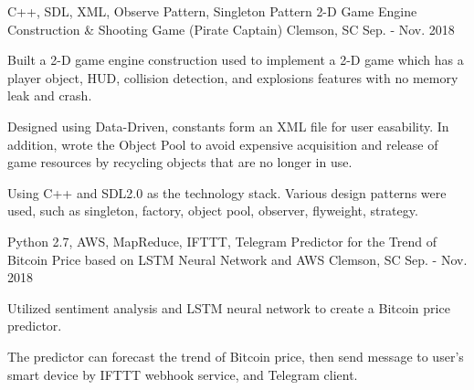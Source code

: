 

\begin{cventries}



  \cventry
    {C++, SDL, XML, Observe Pattern, Singleton Pattern} %
    {2-D Game Engine Construction \& Shooting Game (Pirate Captain)} %
    {Clemson, SC} %
    {Sep. - Nov. 2018}  %
    {
      \begin{cvitems} %
        \item {Built a 2-D game engine construction used to implement a 2-D game which has a player object, HUD, collision detection, and explosions features with no memory leak and crash.}
        \item {Designed using Data-Driven, constants form an XML file for user easability. In addition, wrote the Object Pool to avoid expensive acquisition and release of game resources by recycling objects that are no longer in use.}
        \item {Using C++ and SDL2.0 as the technology stack. Various design patterns were used, such as singleton, factory, object pool, observer, flyweight, strategy.}
      \end{cvitems}
    }

  \cventry
    {Python 2.7, AWS, MapReduce, IFTTT, Telegram} %
    {Predictor for the Trend of Bitcoin Price based on LSTM Neural Network and AWS} %
    {Clemson, SC} %
    {Sep. - Nov. 2018} %
    {
      \begin{cvitems} %
        \item {Utilized sentiment analysis and LSTM neural network to create a Bitcoin price predictor.}
        \item {The predictor can forecast the trend of Bitcoin price, then send message to user's smart device by IFTTT webhook service, and Telegram client.}
      \end{cvitems}
    }



\end{cventries}
